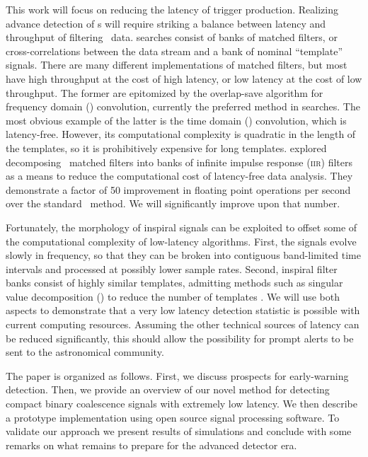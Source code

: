 This work will focus on reducing the latency of trigger production.  Realizing
advance detection of \CBC{}s will require striking a balance between latency
and throughput of filtering \GW\ data. \CBC{} searches consist of banks of
matched filters, or cross-correlations between the data stream and a bank of
nominal ``template'' signals.  There are many different implementations of
matched filters, but most have high throughput at the cost of high latency, or
low latency at the cost of low throughput.  The former are epitomized by the
overlap-save algorithm for frequency domain (\FD) convolution, currently the
preferred method in \GW{} searches.  The most obvious example of the latter is
the time domain (\TD) convolution, which is latency-free.  However, its
computational complexity is quadratic in the length of the templates, so it is
prohibitively expensive for long templates.  \citet{shaunIIR} explored decomposing
\CBC\ matched filters into banks of infinite impulse response (\textsc{iir})
filters as a means to reduce the computational cost of latency-free data analysis.  They
demonstrate a factor of 50 improvement in floating point operations per second
over the standard \TD\ method.  We will significantly improve upon that number.

Fortunately, the morphology of inspiral signals can be exploited to offset some
of the computational complexity of low-latency algorithms.  First, the signals
evolve slowly in frequency, so that they can be broken into contiguous
band-limited time intervals and processed at possibly lower sample rates.
Second, inspiral filter banks consist of highly similar templates, admitting
methods such as singular value decomposition (\SVD{}) to reduce the number of
templates \citep{Cannon:2010p10398}. We will use both aspects to demonstrate
that a very low latency detection statistic is possible with current computing
resources.  Assuming the other technical sources of latency can be reduced
significantly, this should allow the possibility for prompt alerts to be sent
to the astronomical community.

The paper is organized as follows.  First, we discuss prospects for early-warning
detection.  Then, we provide an overview of our novel method for detecting compact
binary coalescence signals with extremely low latency. We then describe a prototype
implementation using open source signal processing software.  To validate our approach
we present results of simulations and conclude with some remarks on what remains to
prepare for the advanced detector era.
